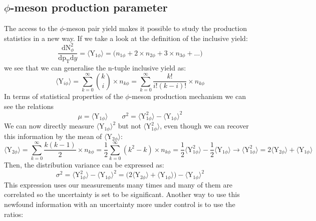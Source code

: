 \subsection{$\phi$-meson production parameter}
The access to the $\phi$-meson pair yield makes it possible to study the production statistics in a new way. If we take a look at the definition of the inclusive yield:
\begin{equation}
\frac{\text{dN}^2_{\phi}}{\text{dp}_{\text{T}}\text{d}y} = \langle \text{Y}_{1\phi} \rangle = \Big( n_{1\phi} + 2\times n_{2\phi} + 3\times n_{3\phi} + \dots \Big)
\label{eq:}
\end{equation}
we see that we can generalise the n-tuple inclusive yield as:
\begin{equation}
\langle \text{Y}_{i\phi} \rangle = \sum_{k=0}^{\infty} \binom{k}{i}\times n_{k\phi} = \sum_{k=0}^{\infty} \frac{k!}{i!(k-i)!} \times n_{k\phi} 
\label{eq:}
\end{equation}
In terms of statistical properties of the $\phi$-meson production mechanism we can see the relations
\begin{equation}
\mu = \langle \text{Y}_{1\phi} \rangle \qquad \sigma^2 = \langle \text{Y}_{1\phi}^2 \rangle -  \langle \text{Y}_{1\phi} \rangle^2
\label{eq:}
\end{equation}
We can now directly measure $\langle \text{Y}_{1\phi} \rangle^2$ but not $\langle \text{Y}_{1\phi}^2 \rangle$, even though we can recover this information by the mean of $\langle \text{Y}_{2\phi} \rangle$:
\begin{equation}
\langle \text{Y}_{2\phi} \rangle = \sum_{k=0}^{\infty} \frac{k(k-1)}{2} \times n_{k\phi} = \frac{1}{2} \sum_{k=0}^{\infty} (k^2-k) \times n_{k\phi} = \frac{1}{2}\langle \text{Y}^2_{1\phi} \rangle - \frac{1}{2}\langle \text{Y}_{1\phi} \rangle \to \langle \text{Y}^2_{1\phi} \rangle = 2\langle \text{Y}_{2\phi} \rangle + \langle \text{Y}_{1\phi} \rangle
\label{eq:}
\end{equation}
Then, the distribution variance can be expressed as:
\begin{equation}
\sigma^2 = \langle \text{Y}_{1\phi}^2 \rangle -  \langle \text{Y}_{1\phi} \rangle^2 = \Big(  2\langle \text{Y}_{2\phi} \rangle + \langle \text{Y}_{1\phi} \rangle \Big) - \langle \text{Y}_{1\phi} \rangle^2
\label{eq:}
\end{equation}
This expression uses our measurements many times and many of them are correlated so the uncertainty is set to be significant. Another way to use this newfound information with an uncertainty more under control is to use the ratios:
